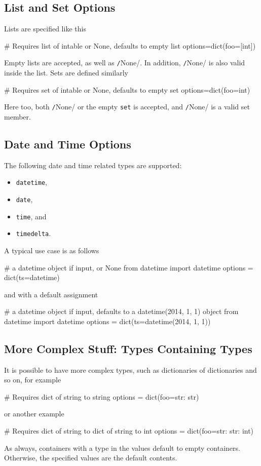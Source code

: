 \subsection{List and Set Options}
Lists are specified like this
\begin{python}
# Requires list of intable or None, defaults to empty list
options=dict(foo=[int])
\end{python}
Empty lists are accepted, as well as \texttt/None/.  In
addition, \texttt/None/ is also valid inside the list.
Sets are defined similarly
\begin{python}
# Requires set of intable or None, defaults to empty set
options=dict(foo={int})
\end{python}
Here too, both \texttt/None/ or the empty \texttt{set} is
accepted, and \texttt/None/ is a valid set member.



\subsection{Date and Time Options}
The following date and time related types are supported:
\begin{itemize}
\item[] \texttt{datetime},
\item[] \texttt{date},
\item[] \texttt{time}, and
\item[] \texttt{timedelta}.
\end{itemize}
A typical use case is as follows
\begin{python}
# a datetime object if input, or None
from datetime import datetime
options = dict(ts=datetime)
\end{python}
and with a default assignment
\begin{python}
#  a datetime object if input, defaults to a datetime(2014, 1, 1) object
from datetime import datetime
options = dict(ts=datetime(2014, 1, 1))
\end{python}



\subsection{More Complex Stuff:  Types Containing Types}
It is possible to have more complex types, such as dictionaries of
dictionaries and so on, for example
\begin{python}
# Requires dict of string to string
options = dict(foo={str: str})
\end{python}
or another example
\begin{python}
# Requires dict of string to dict of string to int
options = dict(foo={str: {str: int}})
\end{python}
As always, containers with a type in the values default to empty
containers.  Otherwise, the specified values are the default contents.



